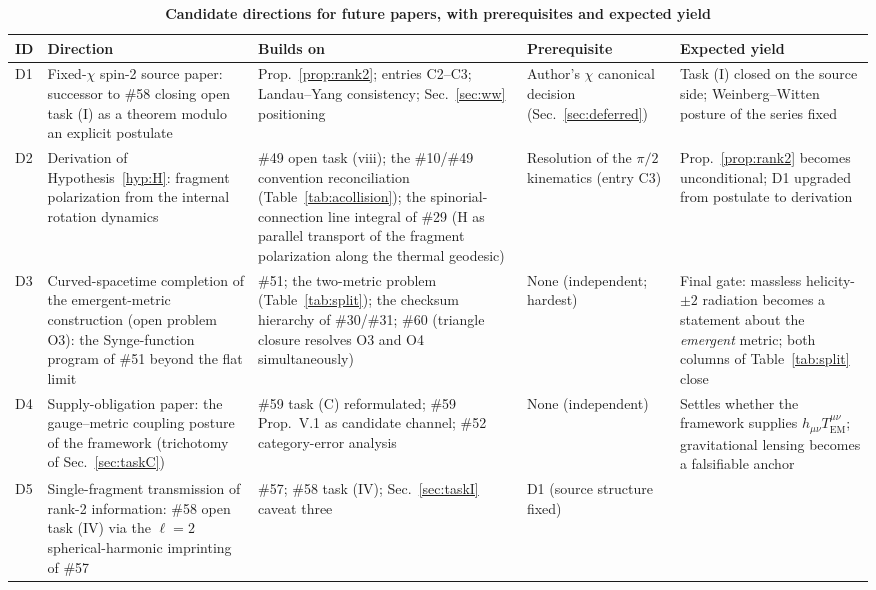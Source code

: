 \documentclass[%
 reprint, amsmath,amssymb, aps, prb, ]{revtex4-2}
\numberwithin{equation}{section}
\begin{document}
\begin{table}[t!]
\centering
\caption{\textbf{Candidate directions for future papers, with prerequisites and expected yield}}
\label{tab:stones}
\renewcommand{\arraystretch}{1.4}
\begin{tabular}{p{0.8cm}p{4.6cm}p{3.4cm}p{3.0cm}p{3.2cm}}
\toprule
\textbf{ID} & \textbf{Direction} & \textbf{Builds on} & \textbf{Prerequisite} & \textbf{Expected yield} \\
\midrule
D1
& Fixed-$\chi$ spin-2 source paper: successor to \#58 closing open task (I) as a theorem modulo an explicit postulate
& Prop.~\ref{prop:rank2}; entries C2--C3; Landau--Yang consistency; Sec.~\ref{sec:ww} positioning
& Author's $\chi$ canonical decision (Sec.~\ref{sec:deferred})
& Task (I) closed on the source side; Weinberg--Witten posture of the series fixed \\
\addlinespace[0.3cm]
D2
& Derivation of Hypothesis~\ref{hyp:H}: fragment polarization from the internal rotation dynamics
& \#49 open task (viii); the \#10/\#49 convention reconciliation (Table~\ref{tab:acollision}); the spinorial-connection line integral of \#29 (H as parallel transport of the fragment polarization along the thermal geodesic)
& Resolution of the $\pi/2$ kinematics (entry C3)
& Prop.~\ref{prop:rank2} becomes unconditional; D1 upgraded from postulate to derivation \\
\addlinespace[0.3cm]
D3
& Curved-spacetime completion of the emergent-metric construction (open problem O3): the Synge-function program of \#51 beyond the flat limit
& \#51; the two-metric problem (Table~\ref{tab:split}); the checksum hierarchy of \#30/\#31; \#60 (triangle closure resolves O3 and O4 simultaneously)
& None (independent; hardest)
& Final gate: massless helicity-$\pm2$ radiation becomes a statement about the \emph{emergent} metric; both columns of Table~\ref{tab:split} close \\
\addlinespace[0.3cm]
D4
& Supply-obligation paper: the gauge--metric coupling posture of the framework (trichotomy of Sec.~\ref{sec:taskC})
& \#59 task (C) reformulated; \#59 Prop.~V.1 as candidate channel; \#52 category-error analysis
& None (independent)
& Settles whether the framework supplies $h_{\mu\nu}T^{\mu\nu}_{\mathrm{EM}}$; gravitational lensing becomes a falsifiable anchor \\
\addlinespace[0.3cm]
D5
& Single-fragment transmission of rank-2 information: \#58 open task (IV) via the $\ell=2$ spherical-harmonic imprinting of \#57
& \#57; \#58 task (IV); Sec.~\ref{sec:taskI} caveat three
& D1 (source structure fixed)

\end{tabular}
\end{table}
\end{document}
